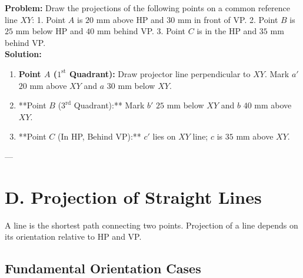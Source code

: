 \begin{example}
\textbf{Problem:} Draw the projections of the following points on a common reference line $XY$:
1. Point $A$ is $20\text{ mm}$ above HP and $30\text{ mm}$ in front of VP.
2. Point $B$ is $25\text{ mm}$ below HP and $40\text{ mm}$ behind VP.
3. Point $C$ is in the HP and $35\text{ mm}$ behind VP.\\[4pt]
\textbf{Solution:}
\begin{enumerate}
    \item \textbf{Point $A$ ($1^{\text{st}}$ Quadrant):} Draw projector line perpendicular to $XY$. Mark $a'$ $20\text{ mm}$ above $XY$ and $a$ $30\text{ mm}$ below $XY$.
    \item **Point $B$ ($3^{\text{rd}}$ Quadrant):** Mark $b'$ $25\text{ mm}$ below $XY$ and $b$ $40\text{ mm}$ above $XY$.
    \item **Point $C$ (In HP, Behind VP):** $c'$ lies on $XY$ line; $c$ is $35\text{ mm}$ above $XY$.
\end{enumerate}
\end{example}

---

\section{D. Projection of Straight Lines}

A line is the shortest path connecting two points. Projection of a line depends on its orientation relative to HP and VP.

\subsection{Fundamental Orientation Cases}

